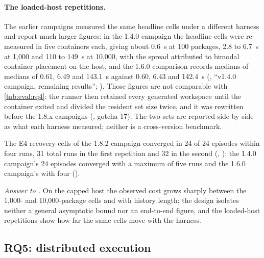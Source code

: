 \paragraph{The loaded-host repetitions.}
The earlier campaigns measured the same headline cells under a different
harness and report much larger figures: in the 1.4.0 campaign the headline
cells were re-measured in five containers each, giving about 0.6~s at 100
packages, 2.8 to 6.7~s at 1,000 and 110 to 149~s at 10,000, with the spread
attributed to bimodal container placement on the host, and the
1.6.0 comparison records medians of medians of 0.61, 6.49 and 143.1~s against
0.60, 6.43 and 142.4~s (, ``v1.4.0 campaign,
remaining results''; ). Those
figures are not comparable with \cref{tab:eval:rq4}: the runner then retained
every generated workspace until the container exited and divided the resident
set size twice, and it was rewritten before the 1.8.x campaigns
(, gotcha 17). The two sets are reported side
by side as what each harness measured; neither is a cross-version benchmark.

The E4 recovery cells of the 1.8.2 campaign converged in 24 of 24 episodes
within four runs, 31 total runs in the first repetition and 32 in the second
(, ); the 1.4.0
campaign's 24 episodes converged with a maximum of five runs and the 1.6.0
campaign's with four ().

\emph{Answer to .} On the capped host the observed cost grows sharply
between the 1,000- and 10,000-package cells and with history length; the
design isolates neither a general asymptotic bound nor an end-to-end figure,
and the loaded-host repetitions show how far the same cells move with the
harness.

\subsection{RQ5: distributed execution}
\label{sec:eval:rq5}

